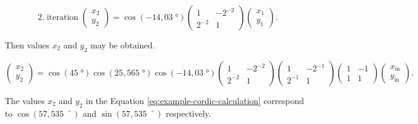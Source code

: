 \documentclass[a4paper, twoside, 11pt]{article}
\begin{document}
            \begin{equation}
                2.\;\text{iteration}\;
                \begin{pmatrix}
                    x_2\\y_2
                \end{pmatrix}
                =
                \cos (-14,03\;°)
                \begin{pmatrix}
                    1 & -2^{-2}\\
                    2^{-2} & 1
                \end{pmatrix}
                \begin{pmatrix}
                    x_1\\
                    y_1
                \end{pmatrix}.
            \end{equation}

            Then values $x_2$ and $y_2$ may be obtained.\par
            \begin{equation}\label{eq:example-cordic-calculation}
                \begin{pmatrix}
                    x_2\\y_2
                \end{pmatrix}
                =
                \cos (45\;°)
                \cos (25,565\;°)
                \cos (-14,03\;°)
                \begin{pmatrix}
                    1 & -2^{-2}\\
                    2^{-2} & 1
                \end{pmatrix}
                \begin{pmatrix}
                    1 & -2^{-1}\\
                    2^{-1} & 1
                \end{pmatrix}
                \begin{pmatrix}
                    1 & -1\\
                    1 & 1
                \end{pmatrix}
                \begin{pmatrix}
                    x_\text{in}\\
                    y_\text{in}
                \end{pmatrix}.
            \end{equation}

            \par
             The values $x_2$ and $y_2$ in the Equation \ref{eq:example-cordic-calculation} correspond to $\cos (57,535\;˚)$ and $\sin (57,535\;˚)$ respectively.
\end{document}
